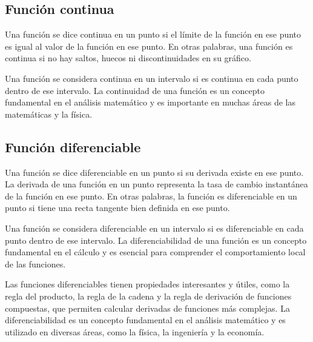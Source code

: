 \subsection{Función continua}
Una función se dice continua en un punto si el límite de la función en ese punto es igual al valor de la función en ese punto. En otras palabras, una función es continua si no hay saltos, huecos ni discontinuidades en su gráfico.

Una función se considera continua en un intervalo si es continua en cada punto dentro de ese intervalo. La continuidad de una función es un concepto fundamental en el análisis matemático y es importante en muchas áreas de las matemáticas y la física.

\subsection{Función diferenciable}
Una función se dice diferenciable en un punto si su derivada existe en ese punto. La derivada de una función en un punto representa la tasa de cambio instantánea de la función en ese punto. En otras palabras, la función es diferenciable en un punto si tiene una recta tangente bien definida en ese punto.

Una función se considera diferenciable en un intervalo si es diferenciable en cada punto dentro de ese intervalo. La diferenciabilidad de una función es un concepto fundamental en el cálculo y es esencial para comprender el comportamiento local de las funciones.

Las funciones diferenciables tienen propiedades interesantes y útiles, como la regla del producto, la regla de la cadena y la regla de derivación de funciones compuestas, que permiten calcular derivadas de funciones más complejas. La diferenciabilidad es un concepto fundamental en el análisis matemático y es utilizado en diversas áreas, como la física, la ingeniería y la economía.